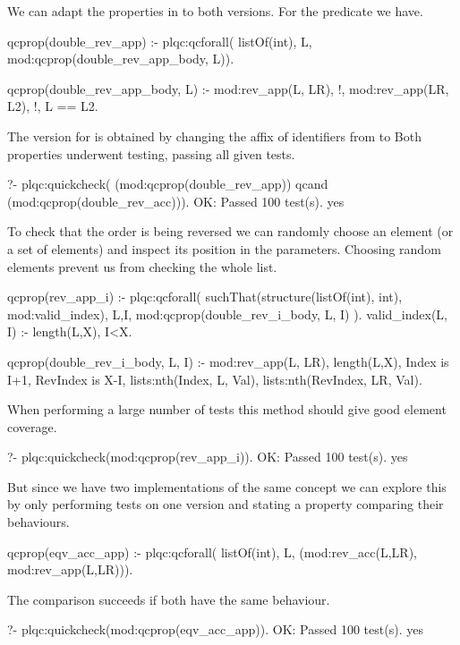 We can adapt the properties in  to both versions.
%
%
For the  predicate we have.
\begin{yapcode}
 qcprop(double_rev_app) :-
   plqc:qcforall( listOf(int), L,
     mod:qcprop({double_rev_app_body, L})).

 qcprop({double_rev_app_body, L}) :- 
   mod:rev_app(L, LR),
   !, %
   mod:rev_app(LR, L2), !, L == L2.
\end{yapcode}
%
The version for  is obtained by changing the affix of
identifiers from  to 
%
Both properties underwent testing, passing all given tests.
%
\begin{yapcode}
   ?- plqc:quickcheck(
          (mod:qcprop(double_rev_app))
        qcand (mod:qcprop(double_rev_acc))).
 OK: Passed 100 test(s).
 yes
\end{yapcode}

To check that the order is being reversed we can randomly choose an
element (or a %
 set of elements) and inspect
 its position in the parameters.
%
Choosing random elements prevent us from checking the whole list.
%
\begin{yapcode}
 qcprop(rev_app_i) :-
   plqc:qcforall(
     suchThat(structure({listOf(int), int}),
       mod:valid_index),
     {L,I},
     mod:qcprop({double_rev_i_body, L, I})
   ).
 valid_index({L, I}) :-
   length(L,X), I<X.

 qcprop({double_rev_i_body, L, I}) :- 
   mod:rev_app(L, LR),
   length(L,X),
   Index is I+1, RevIndex is X-I,
   lists:nth(Index, L, Val),
   lists:nth(RevIndex, LR, Val).
\end{yapcode}
%
When performing a large number of tests this method should give good
element coverage.
%
\begin{yapcode}
   ?- plqc:quickcheck(mod:qcprop(rev_app_i)).
 OK: Passed 100 test(s).
 yes
\end{yapcode}


But since we have two implementations of the same concept we can explore
this by only performing tests on one version and stating a property
comparing their behaviours.
%
\begin{yapcode}
 qcprop(eqv_acc_app) :-
   plqc:qcforall( listOf(int), L,
     (mod:rev_acc(L,LR), mod:rev_app(L,LR))).
\end{yapcode}
The comparison succeeds if both have the same behaviour.
%
\begin{yapcode}
   ?- plqc:quickcheck(mod:qcprop(eqv_acc_app)).
 OK: Passed 100 test(s).
 yes
\end{yapcode}

